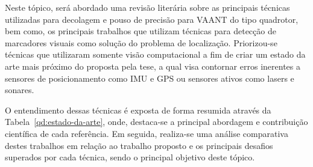 


	
	Neste tópico, será abordado uma revisão literária sobre as principais técnicas utilizadas para decolagem e pouso de precisão para VAANT do tipo quadrotor, bem como, os principais trabalhos que utilizam técnicas para detecção de marcadores visuais como solução do problema de localização. Priorizou-se técnicas que utilizaram somente visão computacional a fim de criar um estado da arte mais próximo do proposta pela tese, a qual visa contornar erros inerentes a sensores de posicionamento como IMU e GPS ou sensores ativos como lasers e sonares. 
	
	O entendimento dessas técnicas é exposta de forma resumida através da Tabela~\ref{qd:estado-da-arte}, onde, destaca-se a principal abordagem e contribuição científica de cada referência. Em seguida, realiza-se uma análise comparativa destes trabalhos em relação ao trabalho proposto e os principais desafios superados por cada técnica, sendo o principal objetivo deste tópico. 
	
